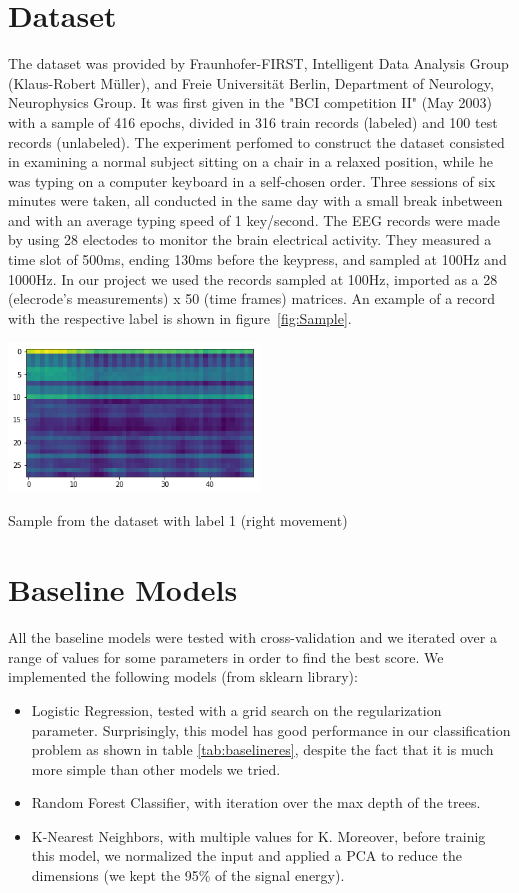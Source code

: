 \documentclass[10pt,conference,compsocconf]{IEEEtran}
\begin{document}
\section{Dataset}
\label{sec:data-analysis}
The dataset was provided by Fraunhofer-FIRST, Intelligent Data Analysis Group (Klaus-Robert Müller), and Freie Universität Berlin, Department of Neurology, Neurophysics Group. It was first given in the "BCI competition II" (May 2003) with a sample of 416 epochs, divided in 316 train records (labeled) and 100 test records (unlabeled).
The experiment perfomed to construct the dataset consisted in examining a normal subject sitting on a chair in a relaxed position, while he was typing on a computer keyboard in a self-chosen order. Three sessions of six minutes were taken, all conducted in the same day with a small break inbetween and with an average typing speed of 1 key/second. The EEG records were made by using 28 electodes to monitor the brain electrical activity. They measured a time slot of 500ms, ending 130ms before the keypress, and sampled at 100Hz and 1000Hz. 
In our project we used the records sampled at 100Hz, imported as a 28 (elecrode's measurements) x 50 (time frames) matrices. 
An example of a record with the respective label is shown in figure~\ref{fig:Sample}.

\begin{center}
	\captionsetup{type=figure}
	\includegraphics[width=0.5\textwidth]{img/sample.png}
	\caption {Sample from the dataset with label 1 (right movement)}
	\label{fig:Sample}
\end{center}


\section{Baseline Models}
\label{sec:baseline}
All the baseline models were tested with cross-validation and we iterated over a range of values for some parameters in order to find the best score.
We implemented the following models (from sklearn library):
\begin{itemize}
\item Logistic Regression, tested with a grid search on the regularization parameter. Surprisingly, this model has good performance in our classification problem as shown in table \ref{tab:baselineres}, despite the fact that it is much more simple than other models we tried.
\item Random Forest Classifier, with iteration over the max depth of the trees.
\item K-Nearest Neighbors, with multiple values for K. Moreover, before trainig this model, we normalized the input and applied a PCA to reduce the dimensions (we kept the 95\% of the signal energy).
\end{itemize}
\end{document}
